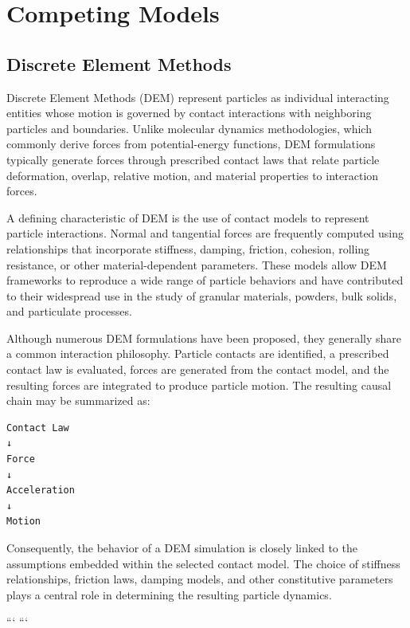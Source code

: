 \section{Competing Models}


\subsection{Discrete Element Methods}

Discrete Element Methods (DEM) represent particles as
individual interacting entities whose motion is governed
by contact interactions with neighboring particles and
boundaries. Unlike molecular dynamics methodologies,
which commonly derive forces from potential-energy
functions, DEM formulations typically generate forces
through prescribed contact laws that relate particle
deformation, overlap, relative motion, and material
properties to interaction forces.

A defining characteristic of DEM is the use of contact
models to represent particle interactions. Normal and
tangential forces are frequently computed using
relationships that incorporate stiffness, damping,
friction, cohesion, rolling resistance, or other
material-dependent parameters. These models allow DEM
frameworks to reproduce a wide range of particle
behaviors and have contributed to their widespread use
in the study of granular materials, powders, bulk solids,
and particulate processes.

Although numerous DEM formulations have been proposed,
they generally share a common interaction philosophy.
Particle contacts are identified, a prescribed contact
law is evaluated, forces are generated from the contact
model, and the resulting forces are integrated to produce
particle motion. The resulting causal chain may be
summarized as:

\begin{verbatim}
Contact Law
↓
Force
↓
Acceleration
↓
Motion
\end{verbatim}

Consequently, the behavior of a DEM simulation is closely
linked to the assumptions embedded within the selected
contact model. The choice of stiffness relationships,
friction laws, damping models, and other constitutive
parameters plays a central role in determining the
resulting particle dynamics.

```
```
